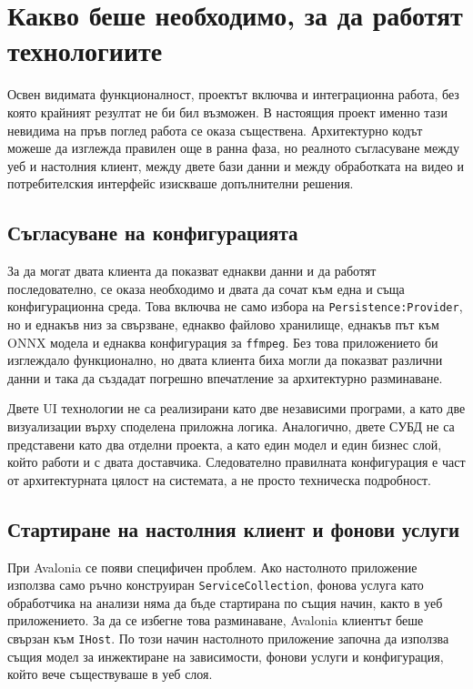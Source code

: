 \chapter{Какво беше необходимо, за да работят технологиите}

Освен видимата функционалност, проектът включва и интеграционна работа, без която крайният резултат не би бил възможен. В настоящия проект именно тази невидима на пръв поглед работа се оказа съществена. Архитектурно кодът можеше да изглежда правилен още в ранна фаза, но реалното съгласуване между уеб и настолния клиент, между двете бази данни и между обработката на видео и потребителския интерфейс изискваше допълнителни решения.

\section{Съгласуване на конфигурацията}

За да могат двата клиента да показват еднакви данни и да работят последователно, се оказа необходимо и двата да сочат към една и съща конфигурационна среда. Това включва не само избора на \texttt{Persistence:Provider}, но и еднакъв низ за свързване, еднакво файлово хранилище, еднакъв път към ONNX модела и еднаква конфигурация за \texttt{ffmpeg}. Без това приложението би изглеждало функционално, но двата клиента биха могли да показват различни данни и така да създадат погрешно впечатление за архитектурно разминаване.

Двете UI технологии не са реализирани като две независими програми, а като две визуализации върху споделена приложна логика. Аналогично, двете СУБД не са представени като два отделни проекта, а като един модел и един бизнес слой, който работи и с двата доставчика. Следователно правилната конфигурация е част от архитектурната цялост на системата, а не просто техническа подробност.

\section{Стартиране на настолния клиент и фонови услуги}

При Avalonia се появи специфичен проблем. Ако настолното приложение използва само ръчно конструиран \texttt{ServiceCollection}, фонова услуга като обработчика на анализи няма да бъде стартирана по същия начин, както в уеб приложението. За да се избегне това разминаване, Avalonia клиентът беше свързан към \texttt{IHost}. По този начин настолното приложение започна да използва същия модел за инжектиране на зависимости, фонови услуги и конфигурация, който вече съществуваше в уеб слоя.

